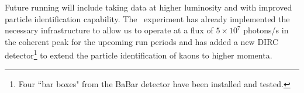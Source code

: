 Future running will include taking data at higher luminosity  and with improved particle identification capability. 
The \gx~experiment has already implemented the necessary infrastructure to allow us to operate at a flux of $5\times10^{7}$ photons/s in the coherent peak for the upcoming run periods and has added a new DIRC detector\footnote{Four ``bar boxes" from the BaBar \cite{Aubert:2001tu} detector have been installed and tested.} to extend the particle identification of kaons to higher momenta. 

